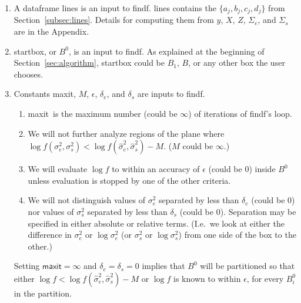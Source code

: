 \documentclass{report}
\newcommand{\textcompute}{\textsf}
\newcommand{\RL}{f}
\newcommand{\logRL}{\log\RL}
\newcommand{\sigssq}{\sigma_s^2}
\newcommand{\sigesq}{\sigma_e^2}
\newcommand{\sshat}{\hat\sigma^2_e,\hat\sigma^2_s}
\newcommand{\logRLss}{\logRL(\sigesq,\sigssq)}
\newcommand{\maxit}{\textcompute{maxit}}
\begin{document}
\begin{enumerate}
\item A dataframe \textcompute{lines} is an input to \textcompute{findf}.  \textcompute{lines} contains the
  $\{a_j, b_j, c_j, d_j \}$ from Section~\ref{subsec:lines}.
  Details for computing them from $y$, $X$, $Z$, $\Sigma_e$, and $\Sigma_s$ are in the Appendix.
\item \textcompute{startbox}, or $B^0$, is an input to \textcompute{findf}.  As explained at the beginning of
  Section~\ref{sec:algorithm}, \textcompute{startbox} could be $B_1$, $B$, or any other box the user chooses.
\item Constants \maxit, $M$, $\epsilon$, $\delta_e$, and $\delta_s$ are inputs to \textcompute{findf}.
	\begin{enumerate}[label=(\alph*)]
	\item \maxit\ is the maximum number (could be $\infty$) of iterations of
		\textcompute{findf}'s loop.
	\item We will not further analyze regions of the plane where
		$\logRLss < \logRL(\sshat) - M$.  ($M$ could be $\infty$.)
	\item We will evaluate $\logRL$ to within an accuracy of $\epsilon$ (could be 0) inside $B^0$
	         unless evaluation is stopped by one of the other criteria.
	\item We will not distinguish values of $\sigesq$ separated by less
		than $\delta_e$ (could be 0) nor values of $\sigssq$ separated by
		less than $\delta_s$ (could be 0).  Separation may be specified
		in either absolute or relative terms. (I.e.\ we look at either the difference
		in $\sigesq$ or $\log\sigesq$ (or $\sigssq$ or $\log\sigssq$) from one
		side of the box to the other.)
	\end{enumerate}
  Setting $\maxit = \infty$ and $\delta_e = \delta_s = 0$ implies that $B^0$ will be partitioned so that either
  $\logRL < \logRL(\sshat) - M$ or $\logRL$ is known to within $\epsilon$, for every $B^0_i$ in the partition.
  

\end{enumerate}
\end{document}
